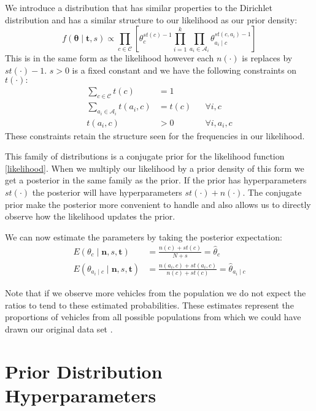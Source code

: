 We introduce a distribution that has similar properties to the Dirichlet distribution and has a similar structure to our likelihood as our prior density:
\begin{equation} \label{prior}
	f(\mathbf{\theta} \mid \mathbf{t}, s) \propto \prod_{c \in \mathcal{C}} \left[ \theta_c^{st(c) - 1} \prod_{i=1}^k \prod_{a_i \in \mathcal{A}_i} \theta_{a_i \mid c}^{st(c, a_i) - 1} \right]
\end{equation}
This is in the same form as the likelihood however each $n(\cdot)$ is replaces by $st(\cdot) - 1$.
$s > 0$ is a fixed constant and we have the following constraints on $t(\cdot):$
\begin{align}\label{prior_constraints}
	\sum_{c \in \mathcal{C}} t(c) & = 1 \\
	\sum_{a_i \in \mathcal{A}_i} t(a_i, c) & = t(c) && \forall i, c \\
	t(a_i, c) & > 0 && \forall i, a_i, c
\end{align}
These constraints retain the structure seen for the frequencies in our likelihood.

This family of distributions is a conjugate prior for the likelihood function \cref{likelihood}.
When we multiply our likelihood by a prior density of this form we get a posterior in the same family as the prior.
If the prior has hyperparameters $st(\cdot)$ the posterior will have hyperparameters $st(\cdot) + n(\cdot)$.
The conjugate prior make the posterior more convenient to handle and also allows us to directly observe how the likelihood updates the prior.

We can now estimate the parameters by taking the posterior expectation:
\begin{align}
	E(\theta_c \mid \mathbf{n},s,\mathbf{t}) & = \frac{n(c) + st(c)}{N + s} = \hat{\theta}_c \\
	E(\theta_{a_i \mid c} \mid \mathbf{n},s,\mathbf{t}) & = \frac{n(a_i, c) + st(a_i, c)}{n(c) + st(c)} = \hat{\theta}_{a_i \mid c}
\end{align}

Note that if we observe more vehicles from the population we do not expect the ratios to tend to these estimated probabilities.
These estimates represent the proportions of vehicles from all possible populations from which we could have drawn our original data set \cite{Lidstone20}.

\section{Prior Distribution Hyperparameters}

